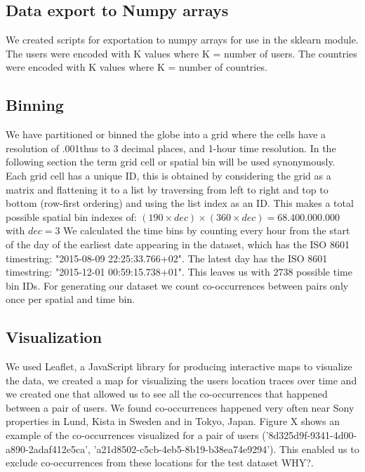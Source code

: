 \subsection{Data export to Numpy arrays}
We created scripts for exportation to numpy arrays for use in the sklearn module. The users were encoded with K values where K = number of users. The countries were encoded with K values where K = number of countries.
\subsection{Binning} \label{ssec:binning}
We have partitioned or binned the globe into a grid where the cells have a resolution of .001\degree thus to 3 decimal places, and 1-hour time resolution. In the following section the term grid cell or spatial bin will be used synonymously. Each grid cell has a unique ID, this is obtained by considering the grid as a matrix and flattening it to a list by traversing from left to right and top to bottom (row-first ordering) and using the list index as an ID. This makes a total possible spatial bin indexes of: $(190\times dec)\times(360\times dec)=68.400.000.000$ with $dec=3$ We calculated the time bins by counting every hour from the start of the day of the earliest date appearing in the dataset, which has the ISO 8601 timestring: "2015-08-09 22:25:33.766+02". The latest day has the ISO 8601 timestring: "2015-12-01 00:59:15.738+01". This leaves us with $2738$ possible time bin IDs. For generating our dataset we count co-occurrences between pairs only once per spatial and time bin.

\subsection{Visualization}
We used Leaflet\cite{leaflet}, a JavaScript library for producing interactive maps to visualize the data, we created a map for visualizing the users location traces over time and we created one that allowed us to see all the co-occurrences that happened between a pair of users. We found co-occurrences happened very often near Sony properties in Lund\cite{sony_headquarters_sweden_lund}, Kista\cite{sony_headquarters_sweden_kista} in Sweden and in Tokyo\cite{sony_headquarters_japan}, Japan. Figure X shows an example of the co-occurrences visualized for a pair of users ('8d325d9f-9341-4d00-a890-2adaf412e5ca', 'a21d8502-c5cb-4eb5-8b19-b38ea74e9294'). This enabled us to exclude co-occurrences from these locations for the test dataset {\color{red} WHY?}.

